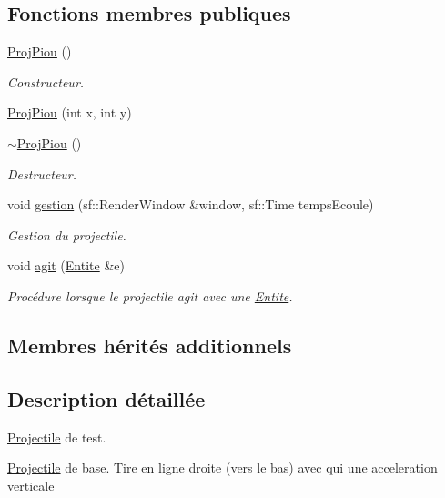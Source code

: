 \subsection*{Fonctions membres publiques}
\begin{DoxyCompactItemize}
\item 
\hyperlink{class_proj_piou_a73d8a01dc3e09f926d14b95b673fd41d}{Proj\+Piou} ()
\begin{DoxyCompactList}\small\item\em Constructeur. \end{DoxyCompactList}\item 
\hyperlink{class_proj_piou_a4aa12294ad8b563aa00848e395fdf06b}{Proj\+Piou} (int x, int y)
\item 
\hyperlink{class_proj_piou_a02224f153ad53afc2b1c40b986ec6492}{$\sim$\+Proj\+Piou} ()
\begin{DoxyCompactList}\small\item\em Destructeur. \end{DoxyCompactList}\item 
void \hyperlink{class_proj_piou_a6efae1f583527446ef824fc1d2823a02}{gestion} (sf\+::\+Render\+Window \&window, sf\+::\+Time temps\+Ecoule)
\begin{DoxyCompactList}\small\item\em Gestion du projectile. \end{DoxyCompactList}\item 
void \hyperlink{class_proj_piou_afd492e686378a86e10136061af035a9f}{agit} (\hyperlink{class_entite}{Entite} \&e)
\begin{DoxyCompactList}\small\item\em Procédure lorsque le projectile agit avec une \hyperlink{class_entite}{Entite}. \end{DoxyCompactList}\end{DoxyCompactItemize}
\subsection*{Membres hérités additionnels}


\subsection{Description détaillée}
\hyperlink{class_projectile}{Projectile} de test. 

\hyperlink{class_projectile}{Projectile} de base. Tire en ligne droite (vers le bas) avec qui une acceleration verticale

